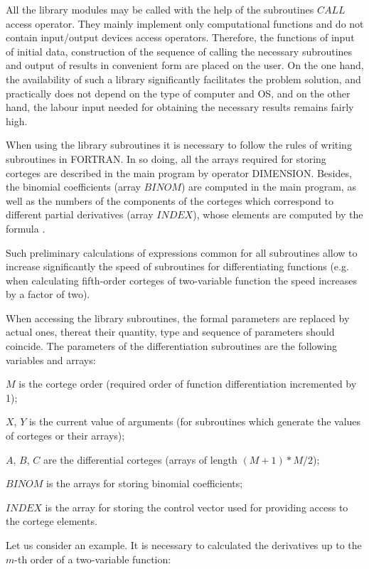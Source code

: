 All the library modules may be called with the help of the subroutines $CALL$
access operator. They mainly implement only computational functions and do
not contain input/output devices access operators. Therefore, the functions
of input of initial data, construction of the sequence of calling the
necessary subroutines and output of results in convenient form are placed on
the user. On the one hand, the availability of such a library significantly
facilitates the problem solution, and practically does not depend on the
type of computer and OS, and on the other hand, the labour input needed for
obtaining the necessary results remains fairly high.

When using the library subroutines it is necessary to follow the rules of
writing subroutines in FORTRAN. In so doing, all the arrays required for
storing corteges are described in the main program by operator DIMENSION.
Besides, the binomial coefficients (array $BINOM$) are computed in the main
program, as well as the numbers of the components of the corteges which
correspond to different partial derivatives (array $INDEX$), whose elements
are computed by the formula .

Such preliminary calculations of expressions common for all subroutines
allow to increase significantly the speed of subroutines for differentiating
functions (e.g. when calculating fifth-order corteges of two-variable
function the speed increases by a factor of two).

When accessing the library subroutines, the formal parameters are replaced
by actual ones, thereat their quantity, type and sequence of parameters
should coincide. The parameters of the differentiation subroutines are the
following variables and arrays:

$M$ is the cortege order (required order of function differentiation
incremented by 1);

$X$, $Y$ is the current value of arguments (for subroutines which generate
the values of corteges or their arrays);

$A$, $B$, $C$ are the differential corteges (arrays of length $(M+1)*M/2$);

$BINOM$ is the arrays for storing binomial coefficients;

$INDEX$ is the array for storing the control vector used for providing
access to the cortege elements.

Let us consider an example. It is necessary to calculated the derivatives up
to the $m$-th order of a two-variable function:

